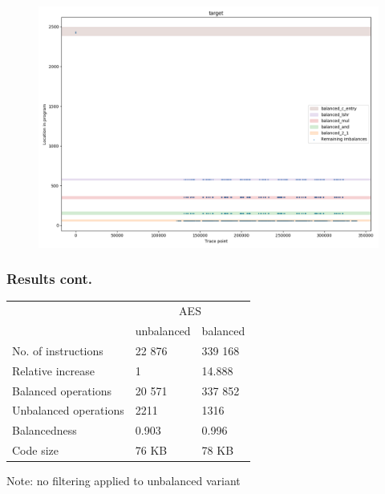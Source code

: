 \documentclass[11pt,t,usepdftitle=false,aspectratio=169]{beamer}
\begin{document}
\begin{frame}
  \begin{figure}
    \centering
    \includegraphics[height=\textheight]{imbalances-3.png}
  \end{figure}
\end{frame}
\begin{frame}
  \frametitle{Results cont.}
  \vfill
  \begin{center}
  \begin{tabular}{|l|l|l|}
    \hline
    & \multicolumn{2}{c|}{AES} \\
    \cline{2-3}
    & unbalanced & balanced \\
    \cline{2-3}
    No. of instructions & 22 876 & 339 168 \\
    Relative increase & 1 & 14.888 \\
    Balanced operations & 20 571 & 337 852 \\
    Unbalanced operations & 2211 & 1316 \\
    Balancedness      & 0.903 & 0.996 \\
    Code size         & 76 KB & 78 KB \\
    \hline
  \end{tabular}
  \end{center}
  \vspace{1ex}
  Note: no filtering applied to unbalanced variant
  \vfill
\end{frame}
\end{document}
